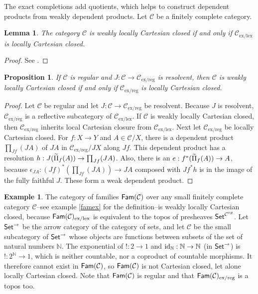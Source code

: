 \documentclass[sort&compress]{elsarticle}
\theoremstyle{plain}
\newtheorem{lemma}[theorem]{Lemma}
\newtheorem{prop}[theorem]{Proposition}
\theoremstyle{definition}
\newtheorem{example}[theorem]{Example}
\theoremstyle{remark}
\newcommand\cat\mathcal
\newcommand\exlex{_\mathrm{ex/lex}}\newcommand\exreg{_\mathrm{ex/reg}}
\begin{document}
The exact completions add quotients, which helps to construct dependent products from weakly dependent products. Let $\cat C$ be a finitely complete category.

\begin{lemma} The category $\cat C$ is weakly locally Cartesian closed if and only if $\cat C\exlex$ is locally Cartesian closed. \end{lemma}

\begin{proof} See \citet{MR1787592}. \end{proof}

\begin{prop} 
If $\cat C$ is regular and $J:\cat C\to\cat C\exreg$ is resolvent, then $\cat C$ is weakly locally Cartesian closed if and only if $\cat C\exreg$ is locally Cartesian closed. \label{lccc}
\end{prop}

\begin{proof} Let $\cat C$ be regular and let $J:\cat C\to\cat C\exreg$ be resolvent. Because $J$ is resolvent, $\cat C\exreg$ is a reflective subcategory of $\cat C\exlex$. If $\cat C$ is weakly locally Cartesian closed, then $\cat C\exreg$ inherits local Cartesian closure from $\cat C\exlex$. Next let $\cat C\exreg$ be locally Cartesian closed. For $f:X\to Y$ and $A\in \cat C/X$, there is a dependent product $\prod_{Jf}(JA)$ of $JA$ in $\cat C\exreg/JX$ along $Jf$. This dependent product has a resolution $h:J(\widetilde{\Pi}_f(A)) \to \prod_{Jf}(JA)$. Also, there is an $e:f^*(\widetilde{\Pi}_f(A)) \to A$, because $\epsilon_{JA}:(Jf)^*(\prod_{Jf}(JA)) \to JA$ composed with $Jf^*h$ is in the image of the fully faithful $J$. These form a weak dependent product. \end{proof}


\newcommand\N{\mathbb N}

\begin{example} The category of families $\Fam(\cat C)$ over any small finitely complete category $\cat C$--see example \ref{famex} for the definition--is weakly locally Cartesian closed, because $\Fam(\cat C)\exlex$ is equivalent to the topos of presheaves $\Set^{\cat C\dual}$. Let $\mathsf{Set}^\to$ be the arrow category of the category of sets, and let $\cat C$ be the small subcategory of $\mathsf{Set}^\to$ whose objects are functions between subsets of the set of natural numbers $\N$.  The exponential of $!:2\to 1$ and $\id_\N:\N\to\N$ (in $\mathsf{Set}^\to$) is $!:2^\N \to 1$, which is neither countable, nor a coproduct of countable morphisms. It therefore cannot exist in $\Fam(\cat C)$, so $\Fam(\cat C)$ is not Cartesian closed, let alone locally Cartesian closed. Note that $\Fam(\cat C)$ is regular and that $\Fam(\cat C)\exreg$ is a topos too. \end{example}%
\end{document}
